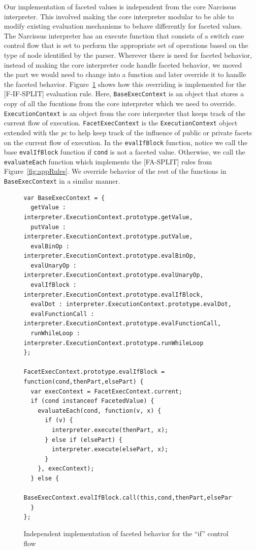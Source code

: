 Our implementation of faceted values is independent from the core Narcissus interpreter.
This involved making the core interpreter modular to be able to modify existing
evaluation mechanisms to behave differently for faceted values. The Narcissus interpreter
has an execute function that consists of a switch case control flow that is set to
perform the appropriate set of operations based on the type of node identified by
the parser. Wherever there is need for faceted behavior, instead of making the core
interpreter code handle faceted behavior, we moved the part we would need to change
into a function and later override it to handle the faceted behavior.
Figure~\ref{fig:facetif} shows how this overriding is implemented for the [F-IF-SPLIT]
evaluation rule. Here, \texttt{BaseExecContext} is an object that stores a copy of all the
fucntions from the core interpreter which we need to override. \texttt{ExecutionContext}
is an object from the core interpreter that keeps track of the current flow of execution.
\texttt{FacetExecContext} is the \texttt{ExecutionContext} object extended with
the \textit{pc} to help keep track of the influence of public or private facets
on the current flow of execution. In the \texttt{evalIfBlock} function, notice we
call the base \texttt{evalIfBlock} function if \texttt{cond} is not a faceted value.
Otherwise, we call the \texttt{evaluateEach} function which implements the [FA-SPLIT]
rules from Figure~\ref{fig:appRules}. We override behavior of the rest of the functions
in \texttt{BaseExecContext} in a similar manner.
\lstset{
  language=javascript,
  frame=single,
  breaklines=true,
  basicstyle=\footnotesize\ttfamily,
  numbers=left,
  extendedchars=true,
  tabsize=2,
  showstringspaces=false
}
\begin{figure}
  \begin{lstlisting}
var BaseExecContext = {
  getValue : interpreter.ExecutionContext.prototype.getValue,
  putValue : interpreter.ExecutionContext.prototype.putValue,
  evalBinOp : interpreter.ExecutionContext.prototype.evalBinOp,
  evalUnaryOp : interpreter.ExecutionContext.prototype.evalUnaryOp,
  evalIfBlock : interpreter.ExecutionContext.prototype.evalIfBlock,
  evalDot : interpreter.ExecutionContext.prototype.evalDot,
  evalFunctionCall : interpreter.ExecutionContext.prototype.evalFunctionCall,
  runWhileLoop : interpreter.ExecutionContext.prototype.runWhileLoop
};

FacetExecContext.prototype.evalIfBlock = function(cond,thenPart,elsePart) {
  var execContext = FacetExecContext.current;
  if (cond instanceof FacetedValue) {
    evaluateEach(cond, function(v, x) {
      if (v) {
        interpreter.execute(thenPart, x);
      } else if (elsePart) {
        interpreter.execute(elsePart, x);
      }
    }, execContext);
  } else {
    BaseExecContext.evalIfBlock.call(this,cond,thenPart,elsePart);
  }
};
  \end{lstlisting}
  \caption{Independent implementation of faceted behavior for the ``if'' control flow}
  \label{fig:facetif}
\end{figure}

